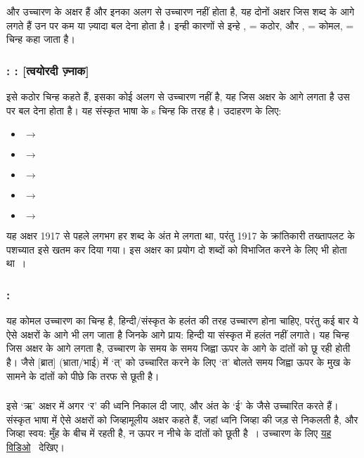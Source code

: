      और  उच्चारण के अक्षर हैं और इनका अलग से उच्चारण नहीं होता है, यह दोनों अक्षर जिस शब्द के आगे लगते हैं उन पर कम या ज़्यादा बल देना होता
    है। इन्ही कारणों से इन्हे ,  = कठोर, और ,  = कोमल,  = चिन्ह कहा जाता है।

    \subsubsection{: : [त्वयोरदी ज़्नाक]}\label{subsubsec:alpha-pronounce-special-char-hard}
      इसे कठोर चिन्ह कहते हैं, इसका कोई अलग से उच्चारण नहीं है, यह जिस अक्षर के आगे लगता है उस पर बल देना होता है। यह संस्कृत भाषा के s चिन्ह कि तरह है। उदाहरण के लिए:
      \begin{itemize}
        \item {} $\rightarrow$
        \item {} $\rightarrow$
        \item {} $\rightarrow$
        \item {} $\rightarrow$
        \item {} $\rightarrow$
      \end{itemize}

      यह अक्षर 1917 से पहले लगभग हर शब्द के अंत मे लगता था, परंतु 1917 के क्रांतिकारी तख्तापलट के पशच्यात इसे खतम कर दिया गया। इस अक्षर का प्रयोग दो शब्दों को विभाजित
      करने के लिए भी होता था~\cite{guzeva_2020}।


    \subsubsection{: }\label{subsubsec:alpha-pronounce-special-char-soft}
      यह कोमल उच्चारण का चिन्ह है, हिन्दी/संस्कृत के हलंत की तरह उच्चारण होना चाहिए, परंतु कई बार ये ऐसे अक्षरों के आगे भी लग जाता है जिनके आगे प्राय: हिन्दी या संस्कृत में
      हलंत नहीं लगाते। यह चिन्ह जिस अक्षर के आगे लगता है, उच्चारण के समय के समय जिह्वा ऊपर के आगे के दांतों को छू रही होती है। जैसे  [ब्रात] (भ्राता/भाई) में `त्'
      को उच्चारित करने के लिए `त' बोलते समय जिह्वा ऊपर के मुख के सामने के दांतों को पीछे कि तरफ से छूती है।


    \subsubsection{}\label{subsubsec:alpha-pronounce-special-char-oui}
      इसे `ऋ' अक्षर में अगर `र' की ध्वनि निकाल दी जाए, और अंत के `ई' के जैसे उच्चारित करते हैं। संस्कृत भाषा में
      ऐसे अक्षरों को जिव्हामूलीय अक्षर कहते हैं, जहां ध्वनि जिव्हा की  जड़ से निकलती है, और जिव्हा स्वय: मुँह  के
      बीच में रहती है, न ऊपर न नीचे के दांतों को छूती है~\cite{macdonald_1926}।
      उच्चारण के लिए \href{https://www .youtube .com/watch?v=s6asiEL1f8U}{यह विडिओ}~\cite{kovalenko_2015} देखिए।

